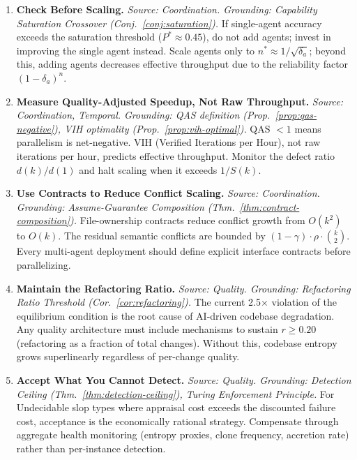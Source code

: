 \begin{enumerate}[label=\textbf{P\arabic*.}, leftmargin=3em, resume]
\item \textbf{Check Before Scaling.}
\emph{Source: Coordination. Grounding: Capability Saturation Crossover (Conj.~\ref{conj:saturation}).}
If single-agent accuracy exceeds the saturation threshold ($P^* \approx 0.45$), do not add agents; invest in improving the single agent instead. Scale agents only to $n^* \approx 1/\sqrt{\delta_a}$; beyond this, adding agents decreases effective throughput due to the reliability factor $(1-\delta_a)^n$.

\item \textbf{Measure Quality-Adjusted Speedup, Not Raw Throughput.}
\emph{Source: Coordination, Temporal. Grounding: QAS definition (Prop.~\ref{prop:qas-negative}), VIH optimality (Prop.~\ref{prop:vih-optimal}).}
QAS $< 1$ means parallelism is net-negative. VIH (Verified Iterations per Hour), not raw iterations per hour, predicts effective throughput. Monitor the defect ratio $d(k)/d(1)$ and halt scaling when it exceeds $1/S(k)$.

\item \textbf{Use Contracts to Reduce Conflict Scaling.}
\emph{Source: Coordination. Grounding: Assume-Guarantee Composition (Thm.~\ref{thm:contract-composition}).}
File-ownership contracts reduce conflict growth from $O(k^2)$ to $O(k)$. The residual semantic conflicts are bounded by $(1-\gamma) \cdot \rho \cdot \binom{k}{2}$. Every multi-agent deployment should define explicit interface contracts before parallelizing.

\item \textbf{Maintain the Refactoring Ratio.}
\emph{Source: Quality. Grounding: Refactoring Ratio Threshold (Cor.~\ref{cor:refactoring}).}
The current 2.5$\times$ violation of the equilibrium condition is the root cause of AI-driven codebase degradation. Any quality architecture must include mechanisms to sustain $r \geq 0.20$ (refactoring as a fraction of total changes). Without this, codebase entropy grows superlinearly regardless of per-change quality.

\item \textbf{Accept What You Cannot Detect.}
\emph{Source: Quality. Grounding: Detection Ceiling (Thm.~\ref{thm:detection-ceiling}), Turing Enforcement Principle.}
For Undecidable slop types where appraisal cost exceeds the discounted failure cost, acceptance is the economically rational strategy. Compensate through aggregate health monitoring (entropy proxies, clone frequency, accretion rate) rather than per-instance detection.


\end{enumerate}
